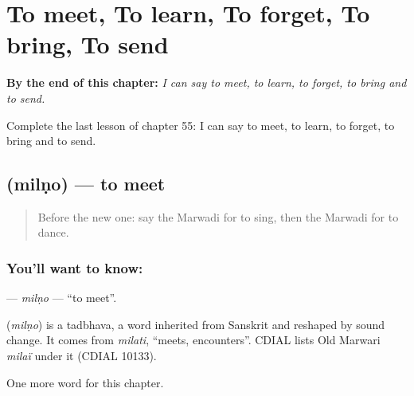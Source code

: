 
\chapter{To meet, To learn, To forget, To bring, To send}
\label{ch:mw-to-meet-to-learn-to-forget-to-bring-to-send}

\begin{chapteropening}
\textbf{By the end of this chapter:} \emph{I can say to meet, to learn, to forget, to bring and to send.}

Complete the last lesson of chapter 55: I can say to meet, to learn, to forget, to bring and to send.
\end{chapteropening}

\section[\texorpdfstring{\mw{मिलणो} (milṇo)}{मिलणो (milṇo)}]{ (milṇo) — to meet}

\label{lesson:MW-C55-milno}



\begin{quote}
Before the new one: say the Marwadi for to sing, then the Marwadi for to dance.
\end{quote}

\subsection*{You'll want to know: }
\textbf{} — \emph{milṇo} — \textquotedblleft{}to meet\textquotedblright{}.

\begin{cousinweb}
\textbf{} (\emph{milṇo}) is a tadbhava, a word inherited from Sanskrit and reshaped by sound change. It comes from \emph{milati}, \textquotedblleft{}meets, encounters\textquotedblright{}. CDIAL lists Old Marwari \emph{milaï} under it (CDIAL 10133).
\end{cousinweb}

\begin{grammarlens}[title={What you've built}]
One more word for this chapter.
\end{grammarlens}

